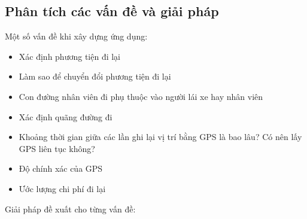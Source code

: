 \documentclass[a4paper]{article}
\begin{document}
\subsection{Phân tích các vấn đề và giải pháp}
Một số vấn đề khi xây dựng ứng dụng:
\begin{itemize}    
    \item Xác định phương tiện đi lại
    \item Làm sao để chuyển đổi phương tiện đi lại
    \item Con đường nhân viên đi phụ thuộc vào người lái xe hay nhân viên
    \item Xác định quãng đường đi
    \item Khoảng thời gian giữa các lần ghi lại vị trí bằng GPS là bao lâu? Có nên lấy GPS liên tục không?
    \item Độ chính xác của GPS
    \item Ước lượng chi phí đi lại
\end{itemize}
Giải pháp đề xuất cho từng vấn đề:
\end{document}
